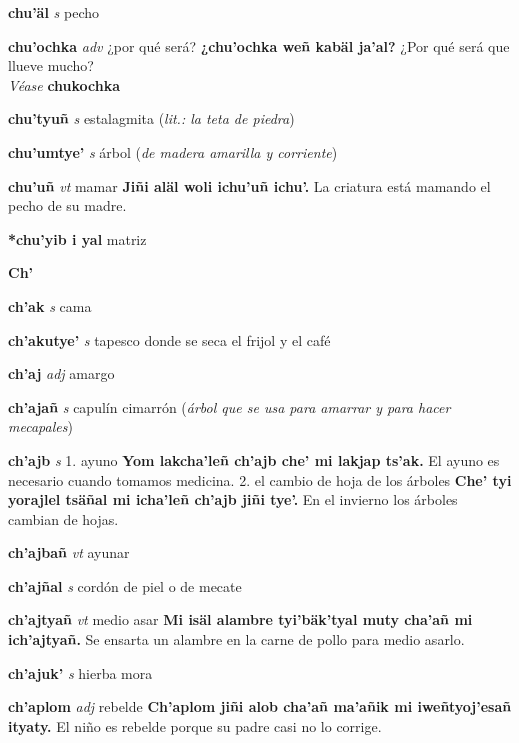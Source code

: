 \documentclass[10pt]{scrbook}
\newcommand{\entry}[1]{\textbf{#1}}
\newcommand{\alphaletter}[1]{\end{multicols}\addsec{#1}\begin{multicols}{2}}
\newcommand{\onedefinition}[1]{#1.}
\newcommand{\partofspeech}[1]{\textit{#1}}
\newcommand{\spanishtranslation}[1]{#1}
\newcommand{\clarification}[1]{(\textit{#1})}
\newcommand{\cholexample}[1]{\textbf{#1}}
\newcommand{\exampletranslation}[1]{#1}
\newcommand{\alsosee}[1]{\\\textit{Véase} \textbf{#1}}
\begin{document}
\begin{multicols}{2}
\entry{chu'äl}
\partofspeech{s}
\spanishtranslation{pecho}

\entry{chu'ochka}
\partofspeech{adv}
\spanishtranslation{¿por qué será?}
\cholexample{¿chu'ochka weñ kabäl ja'al?}
\exampletranslation{¿Por qué será que llueve mucho?}
\alsosee{chukochka}

\entry{chu'tyuñ}
\partofspeech{s}
\spanishtranslation{estalagmita}
\clarification{lit.: la teta de piedra}

\entry{chu'umtye'}
\partofspeech{s}
\spanishtranslation{árbol}
\clarification{de madera amarilla y corriente}

\entry{chu'uñ}
\partofspeech{vt}
\spanishtranslation{mamar}
\cholexample{Jiñi aläl woli ichu'uñ ichu'.}
\exampletranslation{La criatura está mamando el pecho de su madre.}

\entry{*chu'yib i yal}
\spanishtranslation{matriz}

\entry{Ch'}
\alphaletter{Ch'}

\entry{ch'ak}
\partofspeech{s}
\spanishtranslation{cama}

\entry{ch'akutye'}
\partofspeech{s}
\spanishtranslation{tapesco donde se seca el frijol y el café}

\entry{ch'aj}
\partofspeech{adj}
\spanishtranslation{amargo}

\entry{ch'ajañ}
\partofspeech{s}
\spanishtranslation{capulín cimarrón}
\clarification{árbol que se usa para amarrar y para hacer mecapales}

\entry{ch'ajb}
\partofspeech{s}
\onedefinition{1}
\spanishtranslation{ayuno}
\cholexample{Yom lakcha'leñ ch'ajb che' mi lakjap ts'ak.}
\exampletranslation{El ayuno es necesario cuando tomamos medicina.}
\onedefinition{2}
\spanishtranslation{el cambio de hoja de los árboles}
\cholexample{Che' tyi yorajlel tsäñal mi icha'leñ ch'ajb jiñi tye'.}
\exampletranslation{En el invierno los árboles cambian de hojas.}

\entry{ch'ajbañ}
\partofspeech{vt}
\spanishtranslation{ayunar}

\entry{ch'ajñal}
\partofspeech{s}
\spanishtranslation{cordón de piel o de mecate}

\entry{ch'ajtyañ}
\partofspeech{vt}
\spanishtranslation{medio asar}
\cholexample{Mi isäl alambre tyi'bäk'tyal muty cha'añ mi ich'ajtyañ.}
\exampletranslation{Se ensarta un alambre en la carne de pollo para medio asarlo.}

\entry{ch'ajuk'}
\partofspeech{s}
\spanishtranslation{hierba mora}

\entry{ch'aplom}
\partofspeech{adj}
\spanishtranslation{rebelde}
\cholexample{Ch'aplom jiñi alob cha'añ ma'añik mi iweñtyoj'esañ ityaty.}
\exampletranslation{El niño es rebelde porque su padre casi no lo corrige.}


\end{multicols}
\end{document}
